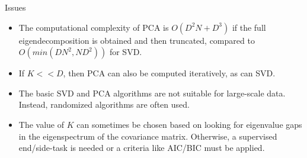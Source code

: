 \documentclass[serif,xcolor=pdftex,dvipsnames,table,hyperref={bookmarks=false,breaklinks}]{beamer}
\begin{document}
\begin{frame}[t]{Issues}

\begin{itemize}
\item The computational complexity of PCA is $O(D^2N + D^3)$ if the full 
eigendecomposition is obtained and then truncated, compared to 
$O(min(DN^2, ND^2))$ for SVD.

\pause\item If $K<<D$, then PCA can also be computed iteratively, as can SVD.

\pause\item The basic SVD and PCA algorithms are not suitable for large-scale 
data. Instead, randomized algorithms are often used.

\pause\item The value of $K$ can sometimes be chosen based on looking for 
eigenvalue gaps in the eigenspectrum of the covariance matrix. Otherwise, a 
supervised end/side-task is needed or a criteria like AIC/BIC must be applied.

\end{itemize} 
\end{frame}

\end{document}
